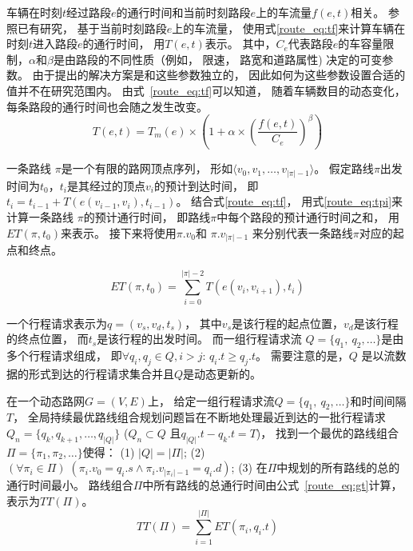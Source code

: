 \begin{definition}[车辆通行时间函数]
    车辆在时刻$t$经过路段$e$的通行时间和当前时刻路段$e$上的车流量$f(e,t)$相关。 参照已有研究， 基于当前时刻路段$e$上的车流量， 使用式\eqref{route_eq:tf}来计算车辆在时刻$t$进入路段$e$的通行时间， 用$T(e,t)$表示。 其中，$C_e$代表路段$e$的车容量限制，$\alpha$和$\beta$是由路段的不同性质（例如， 限速， 路宽和道路属性) 决定的可变参数。 由于提出的解决方案是和这些参数独立的， 因此如何为这些参数设置合适的值并不在研究范围内。 由式~\eqref{route_eq:tf}可以知道， 随着车辆数目的动态变化， 每条路段的通行时间也会随之发生改变。
    \begin{equation}\label{route_eq:tf}
    	    T(e,t)=T_m(e)\times(1+\alpha\times{(\frac{f(e,t)}{C_e})}^\beta)
    \end{equation}

\end{definition}

\begin{definition}[路线及其通行时间]
    一条路线 $\pi$是一个有限的路网顶点序列， 形如$\langle v_0,v_1,\ldots,v_{|\pi|-1}\rangle$。 假定路线$\pi$出发时间为$t_0$，$t_i$是其经过的顶点$v_i$的预计到达时间， 即$t_i=t_{i-1}+T(e(v_{i-1},v_i),t_{i-1})$。 结合式\eqref{route_eq:tf}， 用式\eqref{route_eq:tpi}来计算一条路线 $\pi$的预计通行时间， 即路线$\pi$中每个路段的预计通行时间之和， 用$ET(\pi, t_0)$来表示。 接下来将使用$\pi.v_0$和 $\pi.v_{|\pi|-1}$ 来分别代表一条路线$\pi$对应的起点和终点。

    \begin{equation}\label{route_eq:tpi}
    ET(\pi, t_0)=\sum_{i=0}^{|\pi|-2}T(e(v_{i},v_{i+1}),t_i)
    \end{equation}

\end{definition}

\begin{definition}[行程请求流]
    一个行程请求表示为$q=(v_s, v_d, t_s)$， 其中$v_s$是该行程的起点位置，$v_d$是该行程的终点位置， 而$t_s$是该行程的出发时间。 而一组行程请求流 $Q=\{q_1,\ q_2,\ldots\}$是由多个行程请求组成， 即$\forall q_i,q_j\in Q, i>j$:  $q_i.t \geq q_j.t$。 需要注意的是，$Q$ 是以流数据的形式到达的行程请求集合并且$Q$是动态更新的。
\end{definition}

\begin{definition}[全局持续最优路线组合规划问题]
    在一个动态路网$G=(V,E)$上， 给定一组行程请求流$Q=\{q_1,\ q_2,\ldots\}$和时间间隔$T$， 全局持续最优路线组合规划问题旨在不断地处理最近到达的一批行程请求$Q_n=\{q_k,q_{k+1},\ldots,q_{|Q|}\}$ ($Q_n \subset Q$ 且$q_{|Q|}.t-q_k.t=T$)， 找到一个最优的路线组合$\Pi=\{\pi_1,\pi_2,\ldots\}$使得：
      (1) $|Q|=|\Pi|$;
      (2) $(\forall \pi_i \in \Pi)\;(\pi_i.v_0 = q_i.s \wedge \pi_i.v_{|\pi_i|-1} = q_i.d)$;
      (3) 在$\Pi$中规划的所有路线的总的通行时间最小。 路线组合$\Pi$中所有路线的总通行时间由公式~\eqref{route_eq:gt}计算， 表示为$TT (\Pi)$。
      	\begin{equation}\label{route_eq:gt}
        TT (\Pi)=\sum_{i=1}^{|\Pi|}ET(\pi_i,q_i.t)
	\end{equation}
\end{definition}


